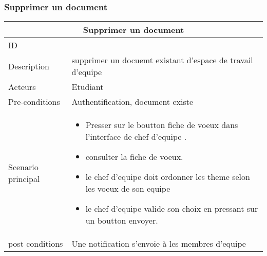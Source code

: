 \documentclass[11pt,fleqn]{book} %
\begin{document}
\subsubsection{Supprimer un document}

\begin{center}
\begin{tabularx}{1\textwidth} { | p{4cm} | >{\raggedright\arraybackslash}X |  }
  \hline
  \multicolumn{2}{|c|}{Supprimer un document} \\
 \hline
 ID & 2  \\
 \hline
 Description  & supprimer un docuemt existant d'espace de travail d'equipe \\
  \hline
 Acteurs  & Etudiant   \\
  \hline
 Pre-conditions  & Authentification, document existe\\
 \hline
 Scenario principal  &  
 \begin{itemize}
     \item Presser sur le boutton fiche de voeux dans l’interface de chef d’equipe .
     \item consulter la fiche de voeux.
     \item le chef d’equipe doit ordonner les theme selon les voeux de son equipe
     \item le chef d’equipe valide son choix en pressant sur un boutton envoyer.

 \end{itemize}\\
  \hline
 post conditions  &  Une notification s’envoie à les membres d'equipe  \\
  \hline
\end{tabularx}
\label{tbl:nicetablelesstable}
\end{center}
\end{document}
